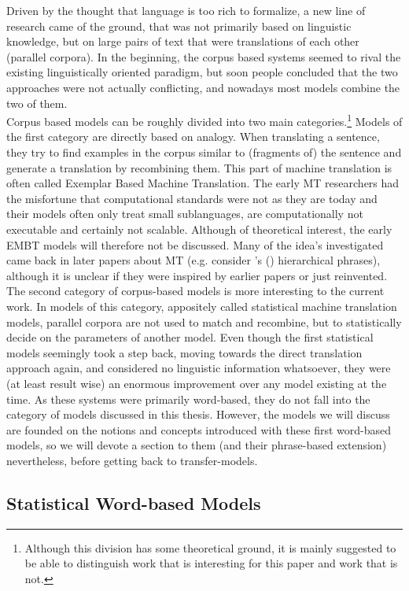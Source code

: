 \documentclass{report}
\theoremstyle{definition}
\theoremstyle{plain}
\def\citepos#1{\citeauthor{#1}'s (\citeyear{#1})}
\begin{document}
Driven by the thought that language is too rich to formalize, a new line of research came of the ground, that was not primarily based on linguistic knowledge, but on large pairs of text that were translations of each other (parallel corpora). In the beginning, the corpus based systems seemed to rival the existing linguistically oriented paradigm, but soon people concluded that the two approaches were not actually conflicting, and nowadays most models combine the two of them.\\
Corpus based models can be roughly divided into two main categories.\footnote{Although this division has some theoretical ground, it is mainly suggested to be able to distinguish work that is interesting for this paper and work that is not.} Models of the first category are directly based on analogy. When translating a sentence, they try to find examples in the corpus similar to (fragments of) the sentence and generate a translation by recombining them. This part of machine translation is often called Exemplar Based Machine Translation. The early MT researchers had the misfortune that computational standards were not as they are today and their models often only treat small sublanguages, are computationally not executable and certainly not scalable. Although of theoretical interest, the early EMBT models will therefore not be discussed. Many of the idea's investigated came back in later papers about MT (e.g. consider \citepos{furuse1992example} hierarchical phrases), although it is unclear if they were inspired by earlier papers or just reinvented.\\
The second category of corpus-based models is more interesting to the current work. In models of this category, appositely called statistical machine translation models, parallel corpora are not used to match and recombine, but to statistically decide on the parameters of another model. Even though the first statistical models seemingly took a step back, moving towards the direct translation approach again, and considered no linguistic information whatsoever, they were (at least result wise) an enormous improvement over any model existing at the time. As these systems were primarily word-based, they do not fall into the category of models discussed in this thesis. However, the models we will discuss are founded on the notions and concepts introduced with these first word-based models, so we will devote a section to them (and their phrase-based extension) nevertheless, before getting back to transfer-models.

\subsection{Statistical Word-based Models}
\end{document}
